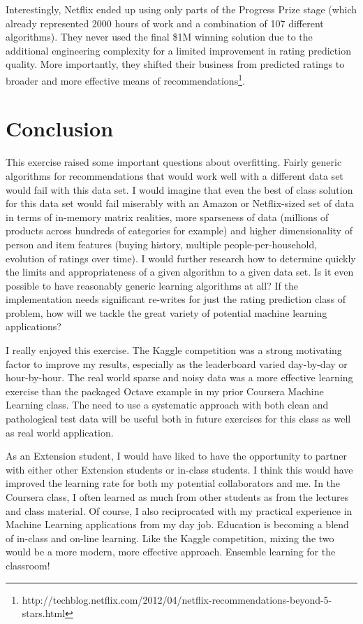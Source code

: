 \documentclass[11pt, oneside]{article}   	%
\begin{document}
Interestingly, Netflix ended up using only parts of the Progress Prize stage (which already represented 2000 hours of work and a combination of 107 different algorithms). They never used the final \$1M winning solution due to the additional engineering complexity for a limited improvement in rating prediction quality. More importantly, they shifted their business from predicted ratings to broader and more effective means of recommendations\footnote{http://techblog.netflix.com/2012/04/netflix-recommendations-beyond-5-stars.html}.

\section*{Conclusion}

This exercise raised some important questions about overfitting. Fairly generic algorithms for recommendations that would work well with a different data set would fail with this data set. I would imagine that even the best of class solution for this data set would fail miserably with an Amazon or Netflix-sized set of data in terms of in-memory matrix realities, more sparseness of data (millions of products across hundreds of categories for example) and higher dimensionality of person and item features (buying history, multiple people-per-household, evolution of ratings over time). I would further research how to determine quickly the limits and appropriateness of a given algorithm to a given data set. Is it even possible to have reasonably generic learning algorithms at all? If the implementation needs significant re-writes for just the rating prediction class of problem, how will we tackle the great variety of potential machine learning applications?

I really enjoyed this exercise. The Kaggle competition was a strong motivating factor to improve my results, especially as the leaderboard varied day-by-day or hour-by-hour. The real world sparse and noisy data was a more effective learning exercise than the packaged Octave example in my prior Coursera Machine Learning class. The need to use a systematic approach with both clean and pathological test data will be useful both in future exercises for this class as well as real world application.

As an Extension student, I would have liked to have the opportunity to partner with either other Extension students or in-class students. I think this would have improved the learning rate for both my potential collaborators and me. In the Coursera class, I often learned as much from other students as from the lectures and class material. Of course, I also reciprocated with my practical experience in Machine Learning applications from my day job. Education is becoming a blend of in-class and on-line learning. Like the Kaggle competition, mixing the two would be a more modern, more effective approach. Ensemble learning for the classroom!
\end{document}
